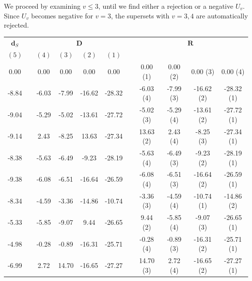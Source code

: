 \documentclass[11pt,a4paper,openright,twoside]{article}
\begin{document}
We proceed by examining $v\leq 3$, until we find either a rejection or a negative $U_v$. Since $U_v$ becomes negative for $v=3$, the supersets with $v=3,4$ are automatically rejected.


\newpage

\begin{table}[h!]
\centering
\begin{tabular}{ccccccccccc}
$\mathbf{d}_S$ & & \multicolumn{4}{c}{$\mathbf{D}$} & & \multicolumn{4}{c}{$\mathbf{R}$}\\
$(5)$ &  & $(4)$ & $(3)$ & $(2)$ & $(1)$ &  &  &  &  &  \\
\cline{1-1} \cline{3-6} \cline{8-11}
0.00 &  & 0.00 & 0.00 & 0.00 & 0.00 &  & 0.00 (1)& 0.00 (2)& 0.00 (3)& 0.00 (4)\\
-8.84 &  & -6.03 & -7.99 & -16.62 & -28.32 &  & -6.03 (4)& -7.99 (3)& -16.62 (2)& -28.32 (1)\\
-9.04 &  & -5.29 & -5.02 & -13.61 & -27.72 &  & -5.02 (3)& -5.29 (4)& -13.61 (2)& -27.72 (1)\\
-9.14 &  & 2.43 & -8.25 & 13.63 & -27.34 &  & 13.63 (2)& 2.43 (4)& -8.25 (3)& -27.34 (1)\\
-8.38 &  & -5.63 & -6.49 & -9.23 & -28.19 &  & -5.63 (4)& -6.49 (3)& -9.23 (2)& -28.19 (1)\\
-9.38 &  & -6.08 & -6.51 & -16.64 & -26.59 &  & -6.08 (4)& -6.51 (3)& -16.64 (2)& -26.59 (1)\\
-8.34 &  & -4.59 & -3.36 & -14.86 & -10.74 &  & -3.36 (3)& -4.59 (4)& -10.74 (1)& -14.86 (2)\\
-5.33 &  & -5.85 & -9.07 & 9.44 & -26.65 &  & 9.44 (2)& -5.85 (4)& -9.07 (3)& -26.65 (1)\\
-4.98 &  & -0.28 & -0.89 & -16.31 & -25.71 &  & -0.28 (4)& -0.89 (3)& -16.31 (2)& -25.71 (1)\\
-6.99 &  & 2.72 & 14.70 & -16.65 & -27.27 &  & 14.70 (3)& 2.72 (4)& -16.65 (2) & -27.27 (1)
\end{tabular}
\end{table}
\end{document}
